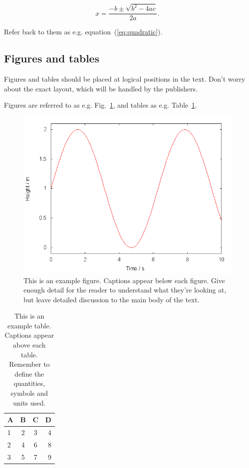 \documentclass[a4paper,fleqn,usenatbib]{mnras}
\begin{document}
\begin{equation}
    x=\frac{-b\pm\sqrt{b^2-4ac}}{2a}.
	\label{eq:quadratic}
\end{equation}

Refer back to them as e.g. equation~(\ref{eq:quadratic}).

\subsection{Figures and tables}

Figures and tables should be placed at logical positions in the text. Don't
worry about the exact layout, which will be handled by the publishers.

Figures are referred to as e.g. Fig.~\ref{fig:example_figure}, and tables as
e.g. Table~\ref{tab:example_table}.

\begin{figure}
	\includegraphics[width=\columnwidth]{example}
    \caption{This is an example figure. Captions appear below each figure.
	Give enough detail for the reader to understand what they're looking at,
	but leave detailed discussion to the main body of the text.}
    \label{fig:example_figure}
\end{figure}

\begin{table}
	\centering
	\caption{This is an example table. Captions appear above each table.
	Remember to define the quantities, symbols and units used.}
	\label{tab:example_table}
	\begin{tabular}{lccr} %
		\hline
		A & B & C & D\\
		\hline
		1 & 2 & 3 & 4\\
		2 & 4 & 6 & 8\\
		3 & 5 & 7 & 9\\
		\hline
	\end{tabular}
\end{table}
\end{document}
